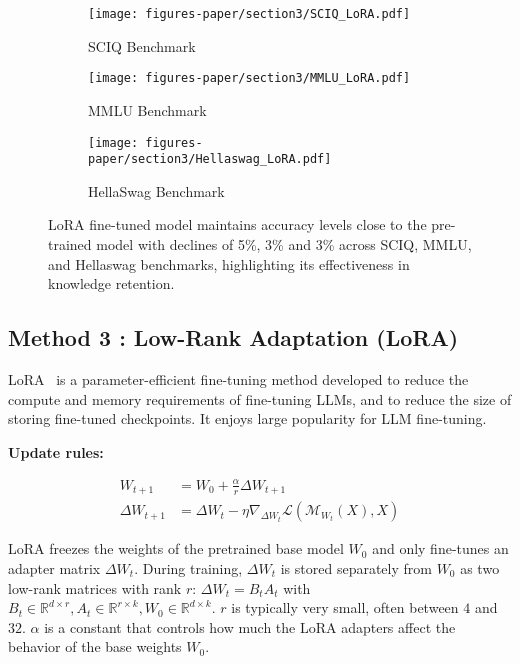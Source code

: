 \begin{figure*}[ht!]
    \centering
        \begin{subfigure}{.3\linewidth}
       \texttt{[image: figures-paper/section3/SCIQ\_LoRA.pdf]}
        \caption{SCIQ Benchmark}
        \label{fig:sciq_lora}
    \end{subfigure}
    \begin{subfigure}{.3\linewidth}
       \texttt{[image: figures-paper/section3/MMLU\_LoRA.pdf]}
        \caption{MMLU Benchmark}
        \label{fig:mmlu_lora}
    \end{subfigure}
     \begin{subfigure}{.3\linewidth}
       \texttt{[image: figures-paper/section3/Hellaswag\_LoRA.pdf]}
        \caption{HellaSwag Benchmark}
        \label{fig:hs_lora}
    \end{subfigure}
    \caption{
    LoRA fine-tuned model maintains accuracy levels close to the pre-trained model with declines of 5\%, 3\% and 3\% across SCIQ, MMLU, and Hellaswag benchmarks, highlighting its effectiveness in knowledge retention.
    }
    \label{fig:bench-lora}
\end{figure*}


\subsection{Method 3 : Low-Rank Adaptation (LoRA)}

LoRA~\cite{hu2022lora} is a parameter-efficient fine-tuning method developed to reduce the compute and memory requirements of fine-tuning LLMs, and to reduce the size of storing fine-tuned checkpoints.
It enjoys large popularity for LLM fine-tuning.

\textbf{Update rules:}

\begin{equation}
\begin{split}
    W_{t + 1} &= W_0 + \frac{\alpha}{r} \Delta W_{t + 1}
 \\
    \Delta W_{t + 1} &= \Delta W_t - \eta \nabla_{\Delta W_t} \mathcal{L}(\mathcal{M}_{W_t}(X), X)
\end{split}
\label{eq:compute_fft}
\end{equation}



LoRA freezes the weights of the pretrained base model $W_0$ and only fine-tunes an adapter matrix $\Delta W_t$.
During training, $\Delta W_t$ is stored separately from $W_0$ as two low-rank matrices with rank $r$: $\Delta W_t = B_t A_t$ with $B_t \in \mathbb{R}^{d \times r}, A_t \in \mathbb{R}^{r \times k}, W_0 \in \mathbb{R}^{d \times k}$.
$r$ is typically very small, often between $4$ and $32$.
$\alpha$ is a constant that controls how much the LoRA adapters affect the behavior of the base weights $W_0$.

